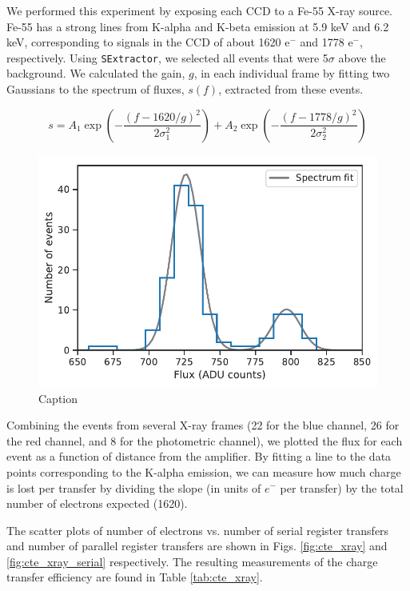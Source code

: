 We performed this experiment by exposing each CCD to a Fe-55 X-ray source. Fe-55 has a strong lines from K-alpha and K-beta emission at 5.9 keV and 6.2 keV, corresponding to signals in the CCD of about 1620 $\textrm{e}^-$ and 1778 $\textrm{e}^-$, respectively. Using \verb|SExtractor|, we selected all events that were 5$\sigma$ above the background. We calculated the gain, $g$, in each individual frame by fitting two Gaussians to the spectrum of fluxes, $s(f)$, extracted from these events.

\begin{equation}
    s = A_1 \exp\left(-\frac{(f-1620/g)^2}{2\sigma_1^2}\right) + A_2 \exp\left(-\frac{(f-1778/g)^2}{2\sigma_2^2}\right)
\end{equation}

\begin{figure}
    \centering
    \includegraphics{figures/chap2/spectrum_fit.pdf}
    \caption{Caption}
    \label{fig:xray_spectrum}
\end{figure}

Combining the events from several X-ray frames (22 for the blue channel, 26 for the red channel, and 8 for the photometric channel), we plotted the flux for each event as a function of distance from the amplifier. By fitting a line to the data points corresponding to the K-alpha emission, we can measure how much charge is lost per transfer by dividing the slope (in units of $e^-$ per transfer) by the total number of electrons expected (1620).

The scatter plots of number of electrons vs. number of serial register transfers and number of parallel register transfers are shown in Figs. \ref{fig:cte_xray} and \ref{fig:cte_xray_serial} respectively. The resulting measurements of the charge transfer efficiency are found in Table \ref{tab:cte_xray}.

